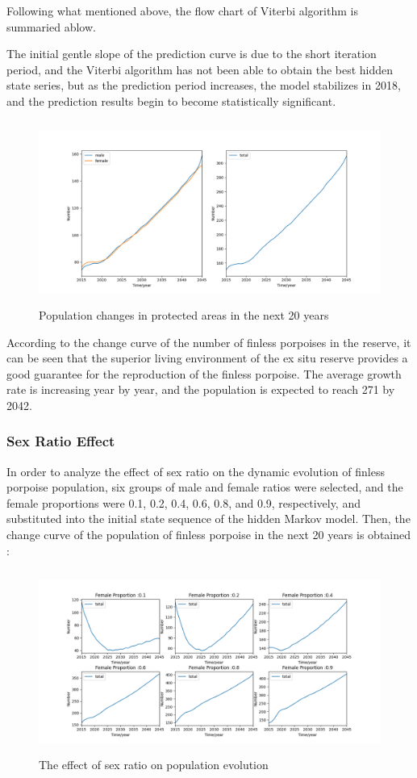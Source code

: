 \documentclass[12pt]{article}  %
\begin{document}
Following what mentioned above, the flow chart of Viterbi algorithm is summaried ablow.

The initial gentle slope of the prediction curve is due to the short iteration period, and the Viterbi algorithm has not been able to obtain the best hidden state series, but as the prediction period increases, the model stabilizes in 2018, and the prediction results begin to become statistically significant.
\begin{figure}[htbp]%
	\small
	\centering
	\includegraphics[height=6cm,width=13cm]{figures/prot1.png}%
	\caption{Population changes in protected areas in the next 20 years}%
\end{figure}

According to the change curve of the number of finless porpoises in the reserve, it can be seen that the superior living environment of the ex situ reserve provides a good guarantee for the reproduction of the finless porpoise. The average growth rate is increasing year by year, and the population is expected to reach 271 by 2042.

\subsubsection{Sex Ratio Effect}
In order to analyze the effect of sex ratio on the dynamic evolution of finless porpoise population, six groups of male and female ratios were selected, and the female proportions were 0.1, 0.2, 0.4, 0.6, 0.8, and 0.9, respectively, and substituted into the initial state sequence of the hidden Markov model. Then, the change curve of the population of finless porpoise in the next 20 years is obtained :
\begin{figure}[htbp]%
	\small
	\centering
	\includegraphics[height=6cm,width=13cm]{figures/sex.png}%
	\caption{The effect of sex ratio on population evolution}%
\end{figure}
\end{document}
